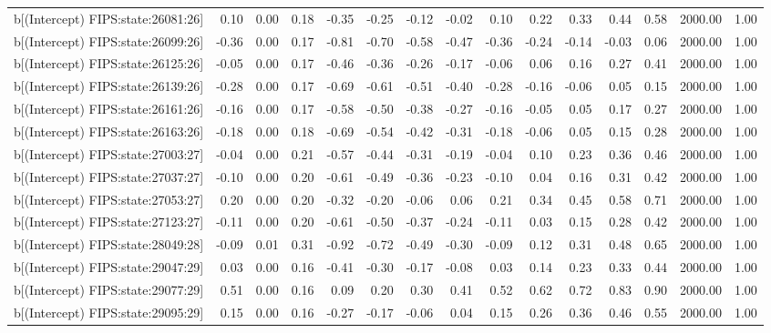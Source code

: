 \begin{table}[ht]
\begin{tabular}{rrrrrrrrrrrrrrr}
  b[(Intercept) FIPS:state:26081:26] & 0.10 & 0.00 & 0.18 & -0.35 & -0.25 & -0.12 & -0.02 & 0.10 & 0.22 & 0.33 & 0.44 & 0.58 & 2000.00 & 1.00 \\ 
  b[(Intercept) FIPS:state:26099:26] & -0.36 & 0.00 & 0.17 & -0.81 & -0.70 & -0.58 & -0.47 & -0.36 & -0.24 & -0.14 & -0.03 & 0.06 & 2000.00 & 1.00 \\ 
  b[(Intercept) FIPS:state:26125:26] & -0.05 & 0.00 & 0.17 & -0.46 & -0.36 & -0.26 & -0.17 & -0.06 & 0.06 & 0.16 & 0.27 & 0.41 & 2000.00 & 1.00 \\ 
  b[(Intercept) FIPS:state:26139:26] & -0.28 & 0.00 & 0.17 & -0.69 & -0.61 & -0.51 & -0.40 & -0.28 & -0.16 & -0.06 & 0.05 & 0.15 & 2000.00 & 1.00 \\ 
  b[(Intercept) FIPS:state:26161:26] & -0.16 & 0.00 & 0.17 & -0.58 & -0.50 & -0.38 & -0.27 & -0.16 & -0.05 & 0.05 & 0.17 & 0.27 & 2000.00 & 1.00 \\ 
  b[(Intercept) FIPS:state:26163:26] & -0.18 & 0.00 & 0.18 & -0.69 & -0.54 & -0.42 & -0.31 & -0.18 & -0.06 & 0.05 & 0.15 & 0.28 & 2000.00 & 1.00 \\ 
  b[(Intercept) FIPS:state:27003:27] & -0.04 & 0.00 & 0.21 & -0.57 & -0.44 & -0.31 & -0.19 & -0.04 & 0.10 & 0.23 & 0.36 & 0.46 & 2000.00 & 1.00 \\ 
  b[(Intercept) FIPS:state:27037:27] & -0.10 & 0.00 & 0.20 & -0.61 & -0.49 & -0.36 & -0.23 & -0.10 & 0.04 & 0.16 & 0.31 & 0.42 & 2000.00 & 1.00 \\ 
  b[(Intercept) FIPS:state:27053:27] & 0.20 & 0.00 & 0.20 & -0.32 & -0.20 & -0.06 & 0.06 & 0.21 & 0.34 & 0.45 & 0.58 & 0.71 & 2000.00 & 1.00 \\ 
  b[(Intercept) FIPS:state:27123:27] & -0.11 & 0.00 & 0.20 & -0.61 & -0.50 & -0.37 & -0.24 & -0.11 & 0.03 & 0.15 & 0.28 & 0.42 & 2000.00 & 1.00 \\ 
  b[(Intercept) FIPS:state:28049:28] & -0.09 & 0.01 & 0.31 & -0.92 & -0.72 & -0.49 & -0.30 & -0.09 & 0.12 & 0.31 & 0.48 & 0.65 & 2000.00 & 1.00 \\ 
  b[(Intercept) FIPS:state:29047:29] & 0.03 & 0.00 & 0.16 & -0.41 & -0.30 & -0.17 & -0.08 & 0.03 & 0.14 & 0.23 & 0.33 & 0.44 & 2000.00 & 1.00 \\ 
  b[(Intercept) FIPS:state:29077:29] & 0.51 & 0.00 & 0.16 & 0.09 & 0.20 & 0.30 & 0.41 & 0.52 & 0.62 & 0.72 & 0.83 & 0.90 & 2000.00 & 1.00 \\ 
  b[(Intercept) FIPS:state:29095:29] & 0.15 & 0.00 & 0.16 & -0.27 & -0.17 & -0.06 & 0.04 & 0.15 & 0.26 & 0.36 & 0.46 & 0.55 & 2000.00 & 1.00 \\ 

\end{tabular}
\end{table}
